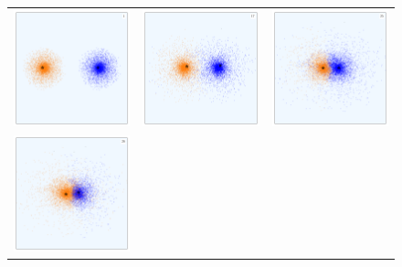 \begin{figure}[!htbp]
    {
        \setlength\tabcolsep{0em}
    	\centering	
    	\begin{tabular}{|p{5.3cm}p{5.3cm}p{5.3cm}|}
    		\hline
    		{\includegraphics[width = 5.3cm]{images/jumper-demo/particleplot_00001.png}}	& 
    		{\includegraphics[width = 5.3cm]{images/jumper-demo/particleplot_00017.png}}	& 
    		{\includegraphics[width = 5.3cm]{images/jumper-demo/particleplot_00025.png}}  \\[-0.5em]
    		{\includegraphics[width = 5.3cm]{images/jumper-demo/particleplot_00026.png}}	& 

\end{tabular}}
\end{figure}
